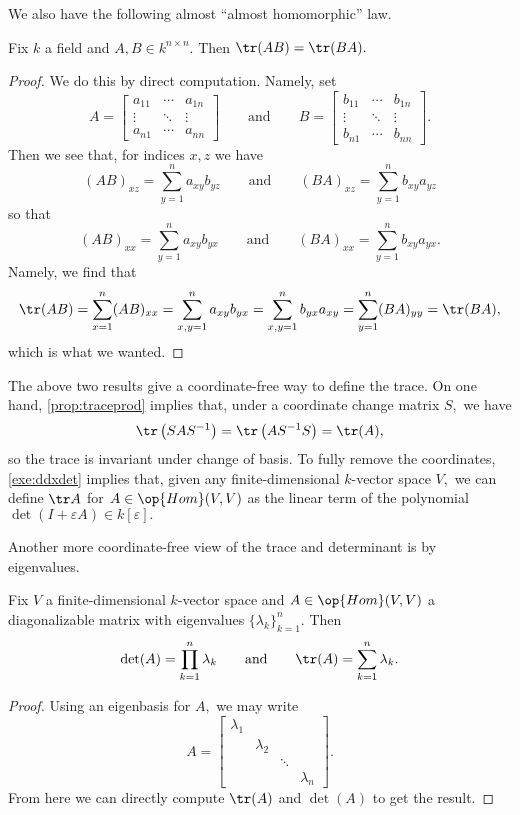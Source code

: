 \documentclass[../notes.tex]{subfiles}
\begin{document}
We also have the following almost ``almost homomorphic'' law.
\begin{prop} \label{prop:traceprod}
	Fix $k$ a field and $A,B\in k^{n\times n}.$ Then $\tr (AB)=\tr (BA).$
\end{prop}
\begin{proof}
	We do this by direct computation. Namely, set
	\[A=\begin{bmatrix}
		a_{11} & \cdots & a_{1n} \\
		\vdots & \ddots & \vdots \\
		a_{n1} & \cdots & a_{nn}
	\end{bmatrix}\qquad\text{and}\qquad B=\begin{bmatrix}
		b_{11} & \cdots & b_{1n} \\
		\vdots & \ddots & \vdots \\
		b_{n1} & \cdots & b_{nn}
	\end{bmatrix}.\]
	Then we see that, for indices $x,z$ we have
	\[(AB)_{xz}=\sum_{y=1}^na_{xy}b_{yz}\qquad\text{and}\qquad(BA)_{xz}=\sum_{y=1}^nb_{xy}a_{yz}\]
	so that
	\[(AB)_{xx}=\sum_{y=1}^na_{xy}b_{yx}\qquad\text{and}\qquad(BA)_{xx}=\sum_{y=1}^nb_{xy}a_{yx}.\]
	Namely, we find that
	\[\tr (AB)=\sum_{x=1}^n(AB)_{xx}=\sum_{x,y=1}^na_{xy}b_{yx}=\sum_{x,y=1}^nb_{yx}a_{xy}=\sum_{y=1}^n(BA)_{yy}=\tr (BA),\]
	which is what we wanted.
\end{proof}
\begin{remark}[Nir]
	The above two results give a coordinate-free way to define the trace. On one hand, \autoref{prop:traceprod} implies that, under a coordinate change matrix $S,$ we have
	\[\tr \left(SAS^{-1}\right)=\tr \left(AS^{-1}S\right)=\tr (A),\]
	so the trace is invariant under change of basis. To fully remove the coordinates, \autoref{exe:ddxdet} implies that, given any finite-dimensional $k$-vector space $V,$ we can define $\tr A$ for $A\in\op{Hom}(V,V)$ as the linear term of the polynomial $\det(I+\varepsilon A)\in k[\varepsilon].$
\end{remark}
Another more coordinate-free view of the trace and determinant is by eigenvalues.
\begin{prop}
	Fix $V$ a finite-dimensional $k$-vector space and $A\in\op{Hom}(V,V)$ a diagonalizable matrix with eigenvalues $\{\lambda_k\}_{k=1}^n.$ Then
	\[\det (A)=\prod_{k=1}^n\lambda_k\qquad\text{and}\qquad\tr (A)=\sum_{k=1}^n\lambda_k.\]
\end{prop}
\begin{proof}
	Using an eigenbasis for $A,$ we may write
	\[A=\begin{bmatrix}
		\lambda_1 \\
		& \lambda_2 \\
		& & \ddots \\
		& & & \lambda_n
	\end{bmatrix}.\]
	From here we can directly compute $\tr (A)$ and $\det (A)$ to get the result.
\end{proof}
\end{document}
